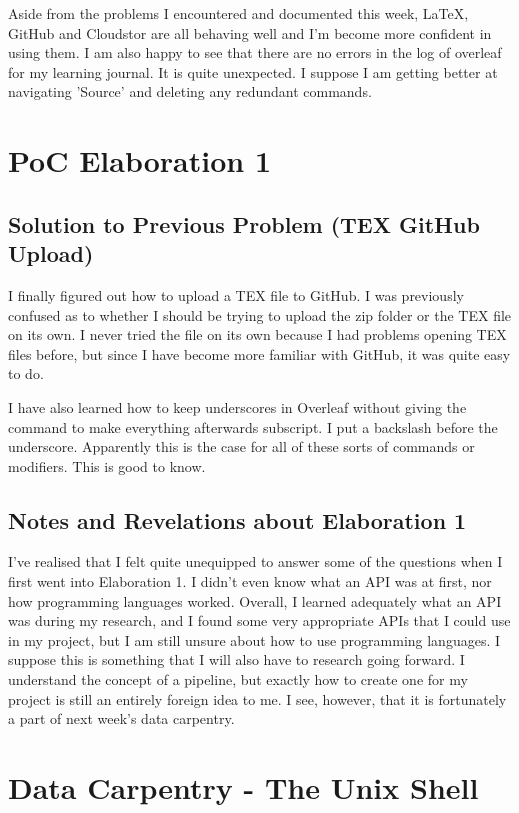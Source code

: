 \documentclass{article}
\begin{document}
Aside from the problems I encountered and documented this week, LaTeX, GitHub and Cloudstor are all behaving well and I’m become more confident in using them. I am also happy to see that there are no errors in the log of overleaf for my learning journal. It is quite unexpected. I suppose I am getting better at navigating 'Source' and deleting any redundant commands.

\date{23rd-29th August 2019}
\section{PoC Elaboration 1}
\subsection{Solution to Previous Problem (TEX GitHub Upload)}
I finally figured out how to upload a TEX file to GitHub. I was previously confused as to whether I should be trying to upload the zip folder or the TEX file on its own. I never tried the file on its own because I had problems opening TEX files before, but since I have become more familiar with GitHub, it was quite easy to do.

I have also learned how to keep underscores in Overleaf without giving the command to make everything afterwards subscript. I put a backslash before the underscore. Apparently this is the case for all of these sorts of commands or modifiers. This is good to know.

\subsection{Notes and Revelations about Elaboration 1}
I've realised that I felt quite unequipped to answer some of the questions when I first went into Elaboration 1. I didn't even know what an API was at first, nor how programming languages worked. Overall, I learned adequately what an API was during my research, and I found some very appropriate APIs that I could use in my project, but I am still unsure about how to use programming languages. I suppose this is something that I will also have to research going forward. I understand the concept of a pipeline, but exactly how to create one for my project is still an entirely foreign idea to me. I see, however, that it is fortunately a part of next week's data carpentry.

\section{Data Carpentry - The Unix Shell}
\end{document}
